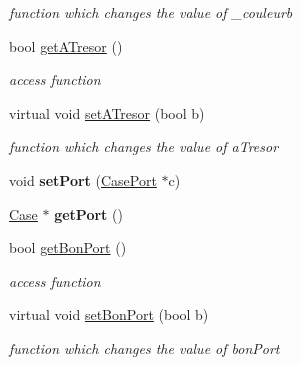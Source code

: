 \begin{DoxyCompactItemize}
\begin{DoxyCompactList}\small\item\em function which changes the value of \_\-couleurb \item\end{DoxyCompactList}\item 
bool \hyperlink{class_bateau_a10a1cc0204e2c0f1db0cdb7471c5bb70}{getATresor} ()
\begin{DoxyCompactList}\small\item\em access function \item\end{DoxyCompactList}\item 
\hypertarget{class_bateau_aefd58da46dd3b977260f42ea9a6647e5}{
virtual void \hyperlink{class_bateau_aefd58da46dd3b977260f42ea9a6647e5}{setATresor} (bool b)}
\label{class_bateau_aefd58da46dd3b977260f42ea9a6647e5}

\begin{DoxyCompactList}\small\item\em function which changes the value of aTresor \item\end{DoxyCompactList}\item 
\hypertarget{class_bateau_a349688b15a9a05a449127c750a54dac8}{
void {\bfseries setPort} (\hyperlink{class_case_port}{CasePort} $\ast$c)}
\label{class_bateau_a349688b15a9a05a449127c750a54dac8}

\item 
\hypertarget{class_bateau_aafff8ffbe9d8fa8f4ed65040f1a6a26d}{
\hyperlink{class_case}{Case} $\ast$ {\bfseries getPort} ()}
\label{class_bateau_aafff8ffbe9d8fa8f4ed65040f1a6a26d}

\item 
bool \hyperlink{class_bateau_a79d789b8f68fff52173b34d8fe6ecd6d}{getBonPort} ()
\begin{DoxyCompactList}\small\item\em access function \item\end{DoxyCompactList}\item 
\hypertarget{class_bateau_aa06e6f4272b39667a5a2776454743538}{
virtual void \hyperlink{class_bateau_aa06e6f4272b39667a5a2776454743538}{setBonPort} (bool b)}
\label{class_bateau_aa06e6f4272b39667a5a2776454743538}

\begin{DoxyCompactList}\small\item\em function which changes the value of bonPort \item\end{DoxyCompactList}\end{DoxyCompactItemize}
